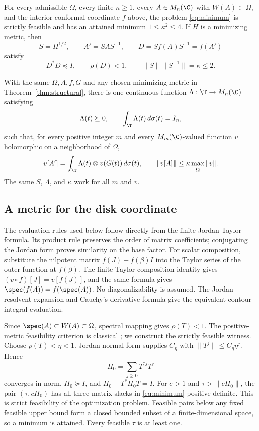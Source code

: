 \begin{theorem}\label{thm:structural}
For every admissible $\Omega$, every finite $n\ge1$, every
$A\in M_n(\C)$ with $W(A)\subset\Omega$, and the interior conformal
coordinate $f$ above, the problem \eqref{eq:minimum} is strictly feasible
and has an attained minimum $1\le\kappa^2\le4$. If $H$ is a minimizing
metric, then
\[
 S=H^{1/2},\qquad A'=SAS^{-1},\qquad D=Sf(A)S^{-1}=f(A')
\]
satisfy
\[
 D^*D\preceq I,\qquad \rho(D)<1,
 \qquad \|S\|\|S^{-1}\|=\kappa\le2.
\]
\end{theorem}

\begin{theorem}\label{thm:representation}
With the same $\Omega,A,f,G$ and any chosen minimizing metric in
Theorem~\ref{thm:structural}, there is one continuous function
$\Lambda:\T\to M_n(\C)$ satisfying
\[
 \Lambda(t)\succeq0,\qquad \int_\T\Lambda(t)\,d\sigma(t)=I_n,
\]
such that, for every positive integer $m$ and every $M_m(\C)$-valued
function $v$ holomorphic on a neighborhood of $\overline\Omega$,
\begin{equation}\label{eq:representation-target}
 v[A']=\int_\T\Lambda(t)\otimes v(G(t))\,d\sigma(t),
 \qquad
 \|v[A]\|\le\kappa\max_{\overline\Omega}\|v\|.
\end{equation}
The same $S$, $\Lambda$, and $\kappa$ work for all $m$ and $v$.
\end{theorem}




\subsection{A metric for the disk coordinate}
The evaluation rules used below follow directly from the finite Jordan
Taylor formula. Its product rule preserves the order of matrix coefficients;
conjugating the Jordan form proves similarity on the base factor. For scalar
composition, substitute the nilpotent matrix $f(J)-f(\beta)I$ into the
Taylor series of the outer function at $f(\beta)$. The finite Taylor
composition identity gives $(v\circ f)[J]=v[f(J)]$, and the same formula
gives $\spec(f(A))=f(\spec(A))$. No diagonalizability is assumed.
The Jordan resolvent expansion and Cauchy's derivative formula give the
equivalent contour-integral evaluation.

Since $\spec(A)\subset W(A)\subset\Omega$, spectral mapping gives
$\rho(T)<1$. The positive-metric feasibility criterion is classical
\cite[Theorem 1]{Stein1952}; we construct the strictly feasible witness.
Choose $\rho(T)<\eta<1$. Jordan normal form supplies
$C_\eta$ with $\|T^j\|\le C_\eta\eta^j$. Hence
\[
 H_0=\sum_{j\ge0}T^{*j}T^j
\]
converges in norm, $H_0\succeq I$, and $H_0-T^*H_0T=I$.
For $c>1$ and $\tau>\|cH_0\|$, the pair $(\tau,cH_0)$ has all
three matrix slacks in \eqref{eq:minimum} positive definite. This is
strict feasibility of the optimization problem. Feasible pairs below any
fixed feasible upper bound form a closed bounded subset of a finite-dimensional
space, so a minimum is attained. Every feasible $\tau$ is at least one.

